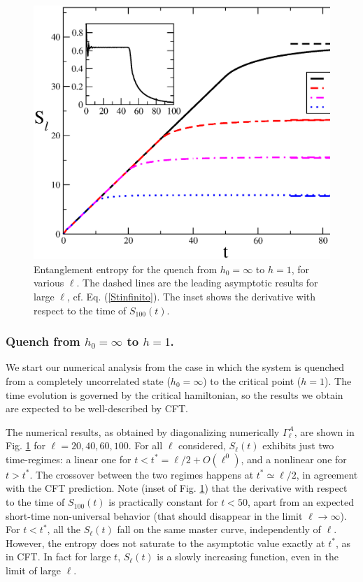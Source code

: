 \documentclass[12pt,preprint,tighten,eqsecnum,aps,floats,psfig,epsfig,amsmath,onecolumn]{revtex4-1}
\begin{document}
\begin{figure}[t]
\centerline{\includegraphics[width=15cm]{SLL2.eps}}
\caption{Entanglement entropy for the quench from $h_0=\infty$ to $h=1$, for 
various $\ell$. 
The dashed lines are the leading asymptotic results for large $\ell$, cf. 
Eq. (\ref{Stinfinito}).
The inset shows the derivative with respect to the time of $S_{100}(t)$.}
\label{SLL}
\end{figure}

\subsubsection{Quench from $h_0=\infty$ to $h=1$.}

We start our numerical analysis from the case in which the system is 
quenched from a completely uncorrelated state ($h_0=\infty$) to the critical 
point ($h=1$). 
The time evolution is governed by the critical hamiltonian, so
the results we obtain are expected to be well-described by CFT.

The numerical results, as obtained by diagonalizing numerically 
$\Gamma^A_\ell$, are shown in Fig. \ref{SLL} for $\ell=20,40,60,100$. 
For all $\ell$ considered, $S_\ell(t)$ exhibits just two time-regimes: 
a linear one for $t<t^*= \ell/2+O(\ell^0)$, and a nonlinear one for $t>t^*$.
The crossover between the two regimes happens 
at $t^*\simeq \ell/2$, in agreement with the CFT prediction. 
Note (inset of Fig. \ref{SLL}) that the derivative with respect to the 
time of $S_{100}(t)$ is practically constant for $t<50$, apart from an 
expected short-time non-universal behavior (that should disappear in the 
limit $\ell\rightarrow\infty$).
For $t<t^*$, all the $S_\ell(t)$ fall on the same master curve, 
independently of $\ell$.
However, the entropy does not saturate to the asymptotic value
exactly at $t^*$, as in CFT. 
In fact for large $t$, $S_\ell(t)$ is a slowly increasing function, even in 
the limit of large $\ell$. 
\end{document}
